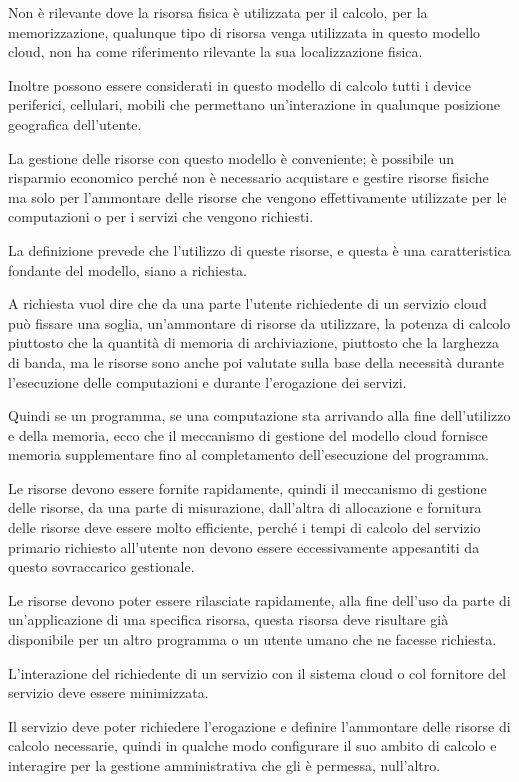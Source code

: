 Non è rilevante dove la risorsa fisica è utilizzata per il calcolo, per la memorizzazione, qualunque tipo di risorsa venga utilizzata in questo modello cloud, non ha come riferimento rilevante la sua localizzazione fisica.

Inoltre possono essere considerati in questo modello di calcolo tutti i device periferici, cellulari, mobili che permettano un'interazione in qualunque posizione geografica dell'utente.

La gestione delle risorse con questo modello è conveniente; è possibile un risparmio economico perché non è necessario acquistare e gestire risorse fisiche ma solo per l'ammontare delle risorse che vengono effettivamente utilizzate per le computazioni o per i servizi che vengono richiesti.

La definizione prevede che l'utilizzo di queste risorse, e questa è una caratteristica fondante del modello, siano a richiesta.

A richiesta vuol dire che da una parte l'utente richiedente di un servizio cloud può fissare una soglia, un'ammontare di risorse da utilizzare, la potenza di calcolo piuttosto che la quantità di memoria di archiviazione, piuttosto che la larghezza di banda, ma le risorse sono anche poi valutate sulla base della necessità durante l'esecuzione delle computazioni e durante l'erogazione dei servizi.

Quindi se un programma, se una computazione sta arrivando alla fine dell'utilizzo e della memoria, ecco che il meccanismo di gestione del modello cloud fornisce memoria supplementare fino al completamento dell'esecuzione del programma.

Le risorse devono essere fornite rapidamente, quindi il meccanismo di gestione delle risorse, da una parte di misurazione, dall'altra di allocazione e fornitura delle risorse deve essere molto efficiente, perché i tempi di calcolo del servizio primario richiesto all'utente non devono essere eccessivamente appesantiti da questo sovraccarico gestionale.

Le risorse devono poter essere rilasciate rapidamente, alla fine dell'uso da parte di un'applicazione di una specifica risorsa, questa risorsa deve risultare già disponibile per un altro programma o un utente umano che ne facesse richiesta.

L'interazione del richiedente di un servizio con il sistema cloud o col fornitore del servizio deve essere minimizzata.

Il servizio deve poter richiedere l'erogazione e definire l'ammontare delle risorse di calcolo necessarie, quindi in qualche modo configurare il suo ambito di calcolo e interagire per la gestione amministrativa che gli è permessa, null'altro.

